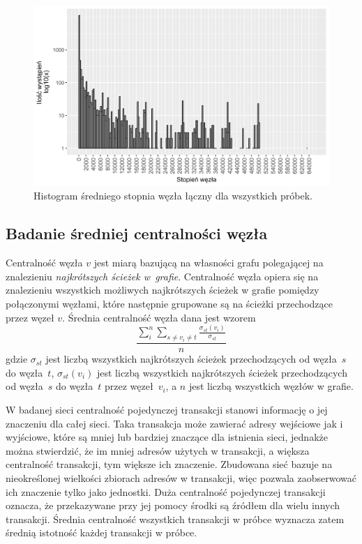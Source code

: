 \documentclass[12pt, twoside, final, openany]{mgr}
\newcommand{\chartsWidth}{0.80}
\begin{document}
\begin{figure}[H]
   \includegraphics[width=\chartsWidth\linewidth]{pictures/sredni_stopien_wezla/sredni_stopien_wezla_hist.png}
   \caption{Histogram średniego stopnia węzła łączny dla wszystkich próbek.}
   \label{fig:sw3}
\end{figure}

\subsection{Badanie średniej centralności węzła}
\label{srednia_centralnosc}
\indent Centralność węzła $v$ jest miarą bazującą na własności grafu polegającej na znalezieniu \textit{najkrótszych ścieżek w~grafie}. Centralność węzła opiera się na znalezieniu wszystkich możliwych najkrótszych ścieżek w grafie pomiędzy połączonymi węzłami, które następnie grupowane są na ścieżki przechodzące przez węzeł $v$. Średnia centralność węzła dana jest wzorem 
\begin{equation}
\label{eq:centralnosc}
  \frac{\sum_i^n\sum_{s \ne v_i \ne t}^{}\frac{\sigma_{st}(v_i)}{\sigma_{st}}}{n}
\end{equation} 
gdzie $\sigma_{st}$ jest liczbą wszystkich najkrótszych ścieżek przechodzących od węzła~$s$ do węzła~$t$, $\sigma_{st}(v_i)$ jest liczbą wszystkich najkrótszych ścieżek przechodzących od węzła~$s$ do węzła~$t$ przez węzeł~$v_i$, a $n$ jest liczbą wszystkich węzłów w grafie\cite{barabasi2016network}.

\indent W badanej sieci centralność pojedynczej transakcji stanowi informację o jej znaczeniu dla całej sieci. Taka transakcja może zawierać adresy wejściowe jak i wyjściowe, które są mniej lub bardziej znaczące dla istnienia sieci, jednakże można stwierdzić, że im mniej adresów użytych w transakcji, a większa centralność transakcji, tym większe ich znaczenie. Zbudowana sieć bazuje na nieokreślonej wielkości zbiorach adresów w transakcji, więc pozwala zaobserwować ich znaczenie tylko jako jednostki. Duża centralność pojedynczej transakcji oznacza, że przekazywane przy jej pomocy środki są źródłem dla wielu innych transakcji. Średnia centralność wszystkich transakcji w próbce wyznacza zatem średnią istotność każdej transakcji w próbce.
\end{document}
